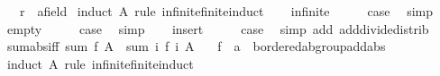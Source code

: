 \begin{isabellebody}
\ \ \ r\ {\isacharcolon}{\kern0pt}{\isacharcolon}{\kern0pt}\ {\isachardoublequoteopen}{\isacharprime}{\kern0pt}a{\isacharcolon}{\kern0pt}{\isacharcolon}{\kern0pt}field{\isachardoublequoteclose}\isanewline
%
\isadelimproof
%
\endisadelimproof
%
\isatagproof
{}\isamarkupfalse%
\ {\isacharparenleft}{\kern0pt}induct\ A\ rule{\isacharcolon}{\kern0pt}\ infinite{\isacharunderscore}{\kern0pt}finite{\isacharunderscore}{\kern0pt}induct{\isacharparenright}{\kern0pt}\isanewline
\ \ \isamarkupfalse%
\ infinite\isanewline
\ \ \isamarkupfalse%
\ \isamarkupfalse%
\ {\isacharquery}{\kern0pt}case\ \isamarkupfalse%
\ simp\isanewline
{}\isamarkupfalse%
\isanewline
\ \ \isamarkupfalse%
\ empty\isanewline
\ \ \isamarkupfalse%
\ \isamarkupfalse%
\ {\isacharquery}{\kern0pt}case\ \isamarkupfalse%
\ simp\isanewline
{}\isamarkupfalse%
\isanewline
\ \ \isamarkupfalse%
\ insert\isanewline
\ \ \isamarkupfalse%
\ \isamarkupfalse%
\ {\isacharquery}{\kern0pt}case\ \isamarkupfalse%
\ {\isacharparenleft}{\kern0pt}simp\ add{\isacharcolon}{\kern0pt}\ add{\isacharunderscore}{\kern0pt}divide{\isacharunderscore}{\kern0pt}distrib{\isacharparenright}{\kern0pt}\isanewline
{}\isamarkupfalse%
%
\endisatagproof
{\isafoldproof}%
%
\isadelimproof
\isanewline
%
\endisadelimproof
\isanewline
{}\isamarkupfalse%
\ sum{\isacharunderscore}{\kern0pt}abs{\isacharbrackleft}{\kern0pt}iff{\isacharbrackright}{\kern0pt}{\isacharcolon}{\kern0pt}\ {\isachardoublequoteopen}{\isasymbar}sum\ f\ A{\isasymbar}\ {\isasymle}\ sum\ {\isacharparenleft}{\kern0pt}{\isasymlambda}i{\isachardot}{\kern0pt}\ {\isasymbar}f\ i{\isasymbar}{\isacharparenright}{\kern0pt}\ A{\isachardoublequoteclose}\isanewline
\ \ \ f\ {\isacharcolon}{\kern0pt}{\isacharcolon}{\kern0pt}\ {\isachardoublequoteopen}{\isacharprime}{\kern0pt}a\ {\isasymRightarrow}\ {\isacharprime}{\kern0pt}b{\isacharcolon}{\kern0pt}{\isacharcolon}{\kern0pt}ordered{\isacharunderscore}{\kern0pt}ab{\isacharunderscore}{\kern0pt}group{\isacharunderscore}{\kern0pt}add{\isacharunderscore}{\kern0pt}abs{\isachardoublequoteclose}\isanewline
%
\isadelimproof
%
\endisadelimproof
%
\isatagproof
{}\isamarkupfalse%
\ {\isacharparenleft}{\kern0pt}induct\ A\ rule{\isacharcolon}{\kern0pt}\ infinite{\isacharunderscore}{\kern0pt}finite{\isacharunderscore}{\kern0pt}induct{\isacharparenright}{\kern0pt}\isanewline

\end{isabellebody}

